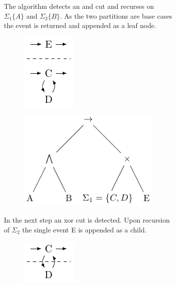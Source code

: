 \documentclass[
	a4paper,
	pagesize,
	pdftex,
	12pt,
	twoside, %
	BCOR=5mm, %
	ngerman,
	fleqn,
	final,
	]{scrartcl}
\begin{document}
\begin{figure}
\begin{subfigure}[t]{\textwidth}
\begin{subfigure}[t]{0.5\textwidth}
 \end{subfigure}
  \caption{The algorithm detects an and cut and recurses on $\Sigma_1\{A\}$ and $\Sigma_2\{B\}$. As the two partitions are base cases the event is returned and appended as a leaf node.}
\end{subfigure}
\begin{subfigure}[t]{\textwidth}
 \begin{subfigure}[t]{0.5\textwidth}
   \centering
   \includegraphics[width=0.3\linewidth]{img/IMExample_xor.pdf}
 \end{subfigure}
 \begin{subfigure}[t]{0.5\textwidth}
   \centering
   \includegraphics[width=0.5\linewidth]{img/xor_tree.pdf}
 \end{subfigure}
    \caption{In the next step an xor cut is detected. Upon recursion of $\Sigma_2$ the single event E is appended as a child.}
\end{subfigure}
\begin{subfigure}[t]{\textwidth}
 \begin{subfigure}[t]{0.5\textwidth}
    \centering
    \includegraphics[width=0.3\linewidth]{img/IMExample_final.pdf}
 \end{subfigure}

\end{subfigure}
\end{figure}
\end{document}
